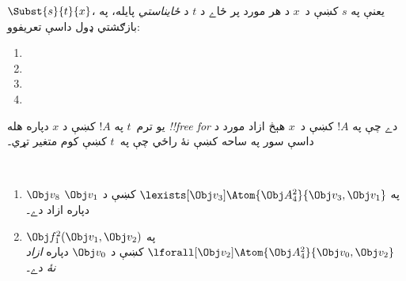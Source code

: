 \documentclass[../../../include/open-logic-section]{subfiles}
\begin{document}


\begin{defn}
$\Subst{s}{t}{x}$، يعنې په $s$ کښې د~$x$ د هر مورد پر ځاے د $t$
د \emph{ځايناستي} پايله، په بازګشتي ډول داسې تعريفوو:
\begin{enumerate}
\item {}

\item {}

\item {}

\item{}
\end{enumerate}
\end{defn}

\begin{defn}
يو ترم~$t$ په $!A$ کښې د $x$ دپاره هله \emph{!!{free for}} دے چې
په $!A$ کښې د~$x$ هېڅ ازاد مورد د داسې سور په ساحه کښې نۀ راځي چې
په~$t$ کښې کوم متغير تړي۔
\end{defn}

\begin{ex} ~
\begin{enumerate}
\item $\Obj v_8$ په $\lexists[\Obj
  v_3]\Atom{\Obj A^2_4}{\Obj v_3,\Obj v_1}$ کښې د $\Obj v_1$ دپاره
  ازاد دے۔

\item $\Obj f^2_1(\Obj v_1, \Obj v_2)$ په
  $\lforall[\Obj v_2]\Atom{\Obj A^2_4}{\Obj v_0,\Obj v_2}$ کښې د
  $\Obj v_0$ دپاره \emph{ازاد نۀ} دے۔
\end{enumerate}
\end{ex}
\end{document}
